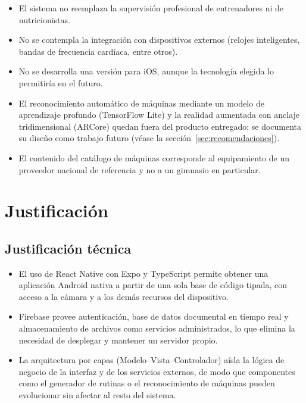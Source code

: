 \begin{itemize}
    \item El sistema no reemplaza la supervisión profesional de entrenadores
    ni de nutricionistas.
    \item No se contempla la integración con dispositivos externos
    (relojes inteligentes, bandas de frecuencia cardíaca, entre otros).
    \item No se desarrolla una versión para iOS, aunque la tecnología elegida
    lo permitiría en el futuro.
    \item El reconocimiento automático de máquinas mediante un modelo de
    aprendizaje profundo (TensorFlow Lite) y la realidad aumentada con anclaje
    tridimensional (ARCore) quedan fuera del producto entregado; se documenta
    su diseño como trabajo futuro (véase la sección~\ref{sec:recomendaciones}).
    \item El contenido del catálogo de máquinas corresponde al equipamiento de
    un proveedor nacional de referencia y no a un gimnasio en particular.
\end{itemize}

\section{Justificación}
\label{sec:justificacion}

\subsection{Justificación técnica}

\begin{itemize}
    \item El uso de React Native con Expo y TypeScript permite obtener una
    aplicación Android nativa a partir de una sola base de código tipada, con
    acceso a la cámara y a los demás recursos del dispositivo.
    \item Firebase provee autenticación, base de datos documental en tiempo
    real y almacenamiento de archivos como servicios administrados, lo que
    elimina la necesidad de desplegar y mantener un servidor propio.
    \item La arquitectura por capas (Modelo--Vista--Controlador) aísla la
    lógica de negocio de la interfaz y de los servicios externos, de modo que
    componentes como el generador de rutinas o el reconocimiento de máquinas
    pueden evolucionar sin afectar al resto del sistema.
\end{itemize}

